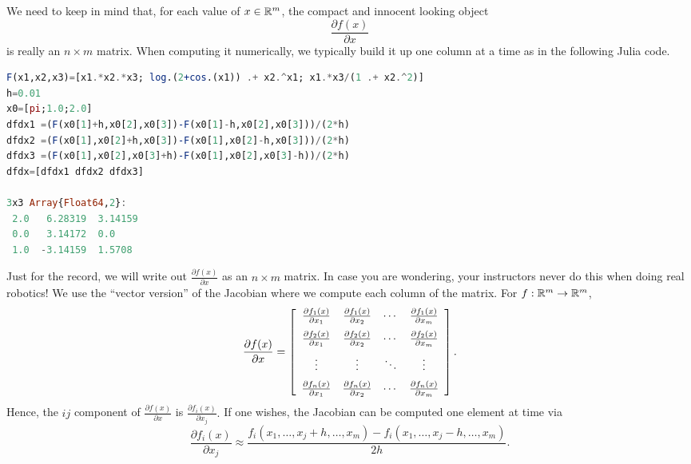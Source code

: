 We need to keep in mind that, for each value of $x\in \mathbb R^m$, the compact and innocent looking object
$$ \frac{\partial f(x)}{\partial x} $$
is really an $n \times m$ matrix. When computing it numerically, we typically build it up one column at a time as in the following Julia code.
    
\begin{lstlisting}[language=Julia,style=mystyle]
F(x1,x2,x3)=[x1.*x2.*x3; log.(2+cos.(x1)) .+ x2.^x1; x1.*x3/(1 .+ x2.^2)]
h=0.01
x0=[pi;1.0;2.0]
dfdx1 =(F(x0[1]+h,x0[2],x0[3])-F(x0[1]-h,x0[2],x0[3]))/(2*h)
dfdx2 =(F(x0[1],x0[2]+h,x0[3])-F(x0[1],x0[2]-h,x0[3]))/(2*h)
dfdx3 =(F(x0[1],x0[2],x0[3]+h)-F(x0[1],x0[2],x0[3]-h))/(2*h)
dfdx=[dfdx1 dfdx2 dfdx3]

3x3 Array{Float64,2}:
 2.0   6.28319  3.14159
 0.0   3.14172  0.0
 1.0  -3.14159  1.5708
 \end{lstlisting}
 
 \vspace*{.2cm}

Just for the record, we will write out $\frac{\partial f(x)}{\partial x}$ as an $n \times m$ matrix. In case you are wondering, your instructors never do this when doing real robotics! We use the ``vector version'' of the Jacobian where we compute each column of the matrix. 
For $f:\mathbb R^m \to \mathbb R^m$, 
\begin{equation}
    \label{eq:optional:VectorFunctions03}
    \frac{\partial f(x)}{\partial x} = \left[\begin{array}{cccc}
      \frac{\partial f_1(x)}{\partial x_1} & \frac{\partial f_1(x)}{\partial x_2} & \cdots & \frac{\partial f_1(x)}{\partial x_m} \medskip \\
      \frac{\partial f_2(x)}{\partial x_1} & \frac{\partial f_2(x)}{\partial x_2} & \cdots & \frac{\partial f_2(x)}{\partial x_m} \medskip \\
      \vdots & \vdots & \ddots & \vdots \medskip \\
      \frac{\partial f_n(x)}{\partial x_1} & \frac{\partial f_n(x)}{\partial x_2} & \cdots & \frac{\partial f_n(x)}{\partial x_m} 
    \end{array} \right].
\end{equation}
Hence, the $ij$ component of $\frac{\partial f(x)}{\partial x}$ is
$\frac{\partial f_i(x)}{\partial x_j}. $
If one wishes, the Jacobian can be computed one element at time via
\begin{equation}
    \label{eq:optional:VectorFunctions03B}
    \frac{\partial f_i(x)}{\partial x_j} \approx \frac{f_i(x_1, \ldots, x_j+h, \ldots, x_m) - f_i(x_1, \ldots, x_j-h, \ldots, x_m)}{2h}. 
    \end{equation}

